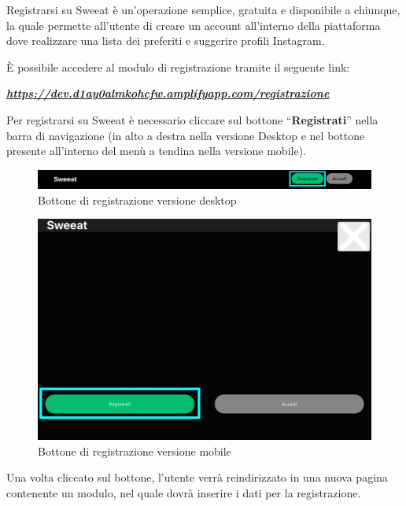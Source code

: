 Registrarsi su Sweeat è un’operazione semplice, gratuita e disponibile a chiunque, la quale permette all’utente di creare un account all’interno della piattaforma dove realizzare una lista dei preferiti e suggerire profili Instagram.

È possibile accedere al modulo di registrazione tramite il seguente link:

\begin{center}
\textsl{ \href{https://dev.d1ay0almkohcfw.amplifyapp.com/registrazione}{\textbf{https://dev.d1ay0almkohcfw.amplifyapp.com/registrazione} }}
\end{center}

Per registrarsi su Sweeat è necessario cliccare sul bottone “\textbf{Registrati}” nella barra di navigazione (in alto a destra nella versione Desktop e nel bottone presente all'interno del menù a tendina nella versione mobile).

\begin{figure}[H]
\centering
\includegraphics[scale=0.15]{./images/Registrazione/RegDesktop.png} 
\caption{Bottone di registrazione versione desktop}
\end{figure}

\begin{figure}[H]
\centering
\includegraphics[scale=0.2]{./images/Registrazione/RegMobile.png} 
\caption{Bottone di registrazione versione mobile}
\end{figure}

Una volta cliccato sul bottone, l’utente verrà reindirizzato in una nuova pagina contenente un modulo, nel quale dovrà inserire i dati per la registrazione.

